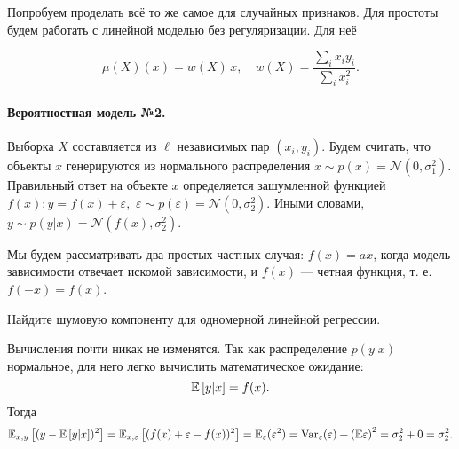 \documentclass[12pt,fleqn]{article}
\begin{document}
Попробуем проделать всё то же самое для случайных признаков.
Для простоты будем работать с линейной моделью без регуляризации.
Для неё

$$
\mu(X)(x) = w(X) \,x, \quad w(X) = \dfrac{\sum_i x_i y_i}{\sum_i x_i^2}.
$$

\paragraph{Вероятностная модель №2.}
Выборка $X$ составляется из $\ell$ независимых пар $(x_i, y_i)$.
Будем считать, что объекты $x$ генерируются из нормального распределения $x \sim p(x) = \mathcal{N}(0, \sigma_1^2)$.
Правильный ответ на объекте $x$ определяется зашумленной функцией $f(x): y = f(x) + \varepsilon$,~$\varepsilon \sim p(\varepsilon) = \mathcal{N}(0, \sigma_2^2)$.
Иными словами, $y \sim p(y|x) = \mathcal{N}(f(x), \sigma_2^2)$.

Мы будем рассматривать два простых частных случая: $f(x) = ax$, когда модель зависимости отвечает искомой зависимости, и $f(x)$ --- четная функция, т. е. $f(-x) = f(x)$.  

\begin{vkProblem}
Найдите шумовую компоненту для одномерной линейной регрессии.
\end{vkProblem}
\begin{esSolution}
    Вычисления почти никак не изменятся.
    Так как распределение $p(y|x)$ нормальное, для него легко вычислить математическое ожидание:
    $$
    \mathbb{E}\left[y|x\right] = f(x).
    $$
    Тогда
    $$
    \mathbb{E}_{x, y}\left[(y - \mathbb{E}\left[y|x\right] )^2\right] = 
    \mathbb{E}_{x, \varepsilon}\left[(f(x) + \varepsilon - f(x) )^2\right] = 
    \mathbb{E}_{\varepsilon} (\varepsilon^2) = \text{Var}_{\varepsilon}(\varepsilon) + \left(\mathbb{E}\varepsilon\right)^2 = \sigma_2^2 + 0 = \sigma_2^2.
    $$
\end{esSolution}
\end{document}
